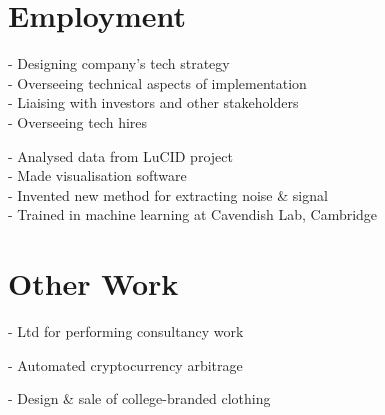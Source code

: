 \documentclass[a4paper]{custom-resume}
\begin{document}
\begin{minipage}[t][0.8\textheight]{0.66\textwidth}


\section{Employment}

\sectionspace

 \vspace{2pt}
- Designing company's tech strategy \\
- Overseeing technical aspects of implementation \\
- Liaising with investors and other stakeholders \\
- Overseeing tech hires

\sectionspace

 \vspace{2pt}
- Analysed data from LuCID project \\
- Made visualisation software \\
- Invented new method for extracting noise \& signal \\
- Trained in machine learning at Cavendish Lab, Cambridge

\vfill


\section{Other Work}

\sectionspace


\vspace{2pt}

- Ltd for performing consultancy work

\vspace{2pt}

- Automated cryptocurrency arbitrage

\vspace{2pt}

- Design \& sale of college-branded clothing


\end{minipage}
\end{document}

